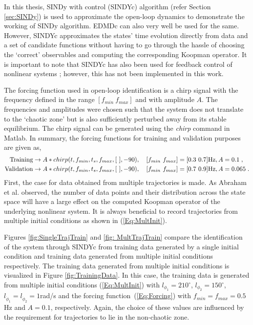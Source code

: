 In this thesis, SINDy with control (SINDYc) algorithm (refer Section \ref{sec:SINDy}) is used to approximate the open-loop dynamics to demonstrate the working of SINDy algorithm. EDMDc can also very well be used for the same. However, SINDYc approximates the states' time evolution directly from data and a set of candidate functions without having to go through the hassle of choosing the `correct' observables and computing the corresponding Koopman operator. It is important to note that SINDYc has also been used for feedback control of nonlinear systems \cite{SINDyc}; however, this has not been implemented in this work.\par
The forcing function used in open-loop identification is a chirp signal with the frequency defined in the range $[f_{min}~ f_{max}]$ and with amplitude $A$. The frequencies and amplitudes were chosen such that the system does not translate to the `chaotic zone' but is also sufficiently perturbed away from its stable equilibrium. The chirp signal can be generated using the \textit{chirp} command in Matlab. In summary, the forcing functions for training and validation purposes are given as,
% 
\begin{align}
\label{Eq:Forcing}
\begin{split}
    \textup{Training} &\rightarrow A*chirp(t,f_{min},t_s,f_{max},[~],-90), \quad [f_{min}~f_{max}] = [0.3 ~ 0.7]\textup{Hz}, A = 0.1 \;, \\ 
    \textup{Validation} &\rightarrow A*chirp(t,f_{min},t_s,f_{max},[~],-90), \quad [f_{min}~f_{max}] = [0.7 ~ 0.9]\textup{Hz}, A = 0.065 \;.
\end{split}
\end{align}
% 
First, the case for data obtained from multiple trajectories is made. As Abraham et al. \cite{Abraham} observed, the number of data points and their distribution across the state space will have a large effect on the computed Koopman operator of the underlying nonlinear system. It is always beneficial to record trajectories from multiple initial conditions as shown in (\ref{Eq:MultInit}).\par
Figures \ref{fig:SingleTrajTrain} and \ref{fig: MultTrajTrain} compare the identification of the system through SINDYc from training data generated by a single initial condition and training data generated from multiple initial conditions respectively. The training data generated from multiple initial conditions is visualized in Figure \ref{fig:TrainingData}. In this case, the training data is generated from multiple initial conditions (\ref{Eq:MultInit}) with $l_{\phi_1} = 210^{\circ}$, $l_{\phi_2} = 150^{\circ}$, $l_{\dot{\phi}_1} = l_{\dot{\phi}_2} = 1$rad/s and the forcing function~(\ref{Eq:Forcing}) with $f_{min} = f_{max} = 0.5$Hz and $A = 0.1$, respectively. Again, the choice of these values are influenced by the requirement for trajectories to lie in the non-chaotic zone.
